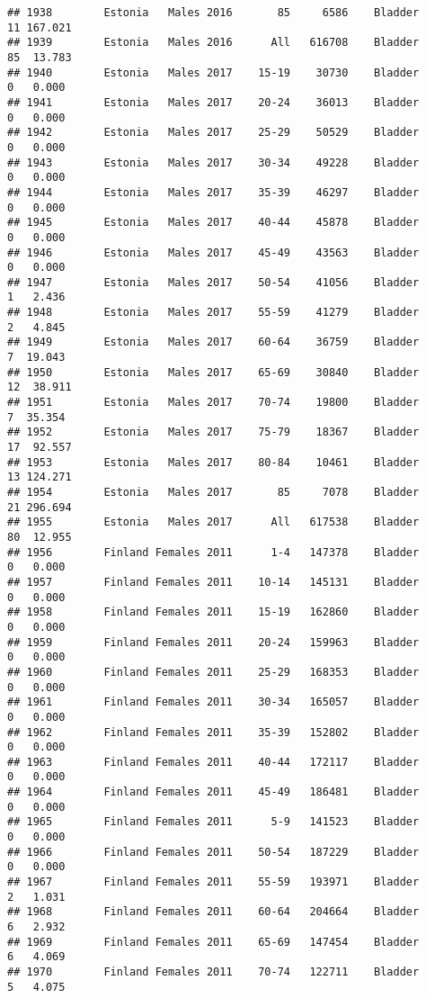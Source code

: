 \documentclass[
]{article}
\begin{document}
\begin{verbatim}
## 1938        Estonia   Males 2016       85     6586    Bladder     11 167.021
## 1939        Estonia   Males 2016      All   616708    Bladder     85  13.783
## 1940        Estonia   Males 2017    15-19    30730    Bladder      0   0.000
## 1941        Estonia   Males 2017    20-24    36013    Bladder      0   0.000
## 1942        Estonia   Males 2017    25-29    50529    Bladder      0   0.000
## 1943        Estonia   Males 2017    30-34    49228    Bladder      0   0.000
## 1944        Estonia   Males 2017    35-39    46297    Bladder      0   0.000
## 1945        Estonia   Males 2017    40-44    45878    Bladder      0   0.000
## 1946        Estonia   Males 2017    45-49    43563    Bladder      0   0.000
## 1947        Estonia   Males 2017    50-54    41056    Bladder      1   2.436
## 1948        Estonia   Males 2017    55-59    41279    Bladder      2   4.845
## 1949        Estonia   Males 2017    60-64    36759    Bladder      7  19.043
## 1950        Estonia   Males 2017    65-69    30840    Bladder     12  38.911
## 1951        Estonia   Males 2017    70-74    19800    Bladder      7  35.354
## 1952        Estonia   Males 2017    75-79    18367    Bladder     17  92.557
## 1953        Estonia   Males 2017    80-84    10461    Bladder     13 124.271
## 1954        Estonia   Males 2017       85     7078    Bladder     21 296.694
## 1955        Estonia   Males 2017      All   617538    Bladder     80  12.955
## 1956        Finland Females 2011      1-4   147378    Bladder      0   0.000
## 1957        Finland Females 2011    10-14   145131    Bladder      0   0.000
## 1958        Finland Females 2011    15-19   162860    Bladder      0   0.000
## 1959        Finland Females 2011    20-24   159963    Bladder      0   0.000
## 1960        Finland Females 2011    25-29   168353    Bladder      0   0.000
## 1961        Finland Females 2011    30-34   165057    Bladder      0   0.000
## 1962        Finland Females 2011    35-39   152802    Bladder      0   0.000
## 1963        Finland Females 2011    40-44   172117    Bladder      0   0.000
## 1964        Finland Females 2011    45-49   186481    Bladder      0   0.000
## 1965        Finland Females 2011      5-9   141523    Bladder      0   0.000
## 1966        Finland Females 2011    50-54   187229    Bladder      0   0.000
## 1967        Finland Females 2011    55-59   193971    Bladder      2   1.031
## 1968        Finland Females 2011    60-64   204664    Bladder      6   2.932
## 1969        Finland Females 2011    65-69   147454    Bladder      6   4.069
## 1970        Finland Females 2011    70-74   122711    Bladder      5   4.075

\end{verbatim}
\end{document}
